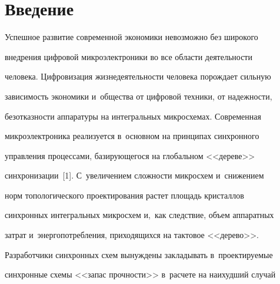 








 \thispagestyle{headings}

 

 \vspace*{-22pt}



\section{Введение}



\vspace*{-4pt}

  

  Успешное развитие современной экономики невозможно без широкого 

внед\-ре\-ния циф\-ро\-вой микроэлектроники во все области де\-я\-тель\-ности 

человека. Циф\-ро\-ви\-за\-ция жиз\-не\-де\-я\-тель\-ности человека по\-рож\-да\-ет сильную 

за\-ви\-си\-мость экономики и~общества от циф\-ро\-вой техники, от на\-деж\-ности, 

без\-от\-каз\-ности аппаратуры на интегральных мик\-ро\-схе\-мах. Современная 

мик\-ро\-элект\-ро\-ни\-ка реализуется в~основном на принципах синхронного 

управ\-ле\-ния процессами, ба\-зи\-ру\-юще\-го\-ся на глобальном <<дереве>> 

синхронизации~[1]. С~увеличением слож\-ности мик\-ро\-схем и~снижением 

норм топологического проектирования рас\-тет площадь крис\-тал\-лов 

синхронных интегральных мик\-ро\-схем и,~как следствие, объем аппаратных 

за\-трат и~энер\-го\-по\-треб\-ле\-ния, приходящихся на так\-то\-вое <<дерево>>. 

Разработчики синхронных схем вы\-нуж\-де\-ны за\-кла\-ды\-вать в~про\-ек\-ти\-ру\-емые 

синхронные схемы <<запас проч\-ности>> в~расчете на наихудший случай 

